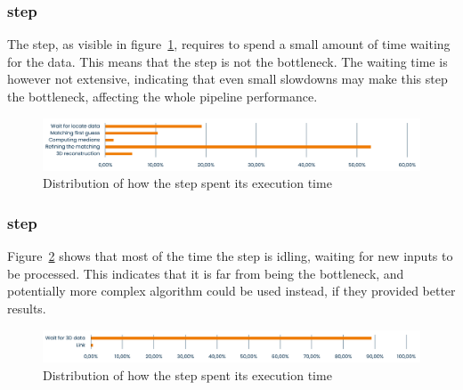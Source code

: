 \subsubsection{\match* step}

The \match* step, as visible in figure~\ref{fig:speed:match}, requires to spend a small amount of time waiting for the \locate* data.
This means that the \match* step is not the bottleneck.
The waiting time is however not extensive, indicating that even small slowdowns may make this step the bottleneck, affecting the whole pipeline performance.

\begin{figure}
	\centerline{\includegraphics[width=\textwidth]{images/speed/matching.png}}
	\caption{\centering Distribution of how the \match* step spent its execution time}
	\label{fig:speed:match}
\end{figure}

\subsubsection{\link* step}

Figure~\ref{fig:speed:link} shows that most of the time the \link* step is idling, waiting for new inputs to be processed.
This indicates that it is far from being the bottleneck, and potentially more complex algorithm could be used instead, if they provided better results.

\begin{figure}[H]
	\centerline{\includegraphics[width=\textwidth]{images/speed/link.png}}
	\caption{\centering Distribution of how the \link* step spent its execution time}
	\label{fig:speed:link}
\end{figure}
